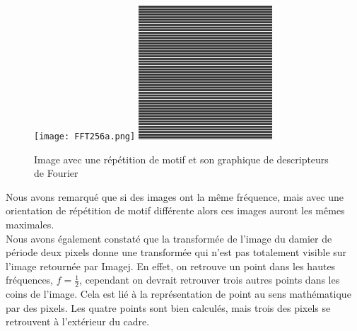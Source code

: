 \documentclass[a4paper,11pt]{article}
\begin{document}
  \begin{figure}[H]
  \center
   \texttt{[image: FFT256a.png]}
   \includegraphics[width=5cm]{256_a.jpg}
   \caption{Image avec une répétition de motif et son graphique de descripteurs de Fourier}
  \end{figure}
  
  Nous avons remarqué que si des images ont la même fréquence, mais avec une orientation de répétition de motif
  différente alors ces images auront les mêmes maximales.\\
  
  Nous avons également constaté que la transformée de l'image du damier de période deux pixels donne une transformée 
  qui n'est pas totalement visible sur l'image retournée par Imagej. En effet, on retrouve un point dans les hautes 
  fréquences, $f=\frac{1}{2}$, cependant on devrait retrouver trois autres points dans les coins de l'image. Cela est lié à la 
  représentation de point au sens mathématique par des pixels. Les quatre points sont bien calculés, mais trois des pixels 
  se retrouvent à l'extérieur du cadre.\\
  
\end{document}
